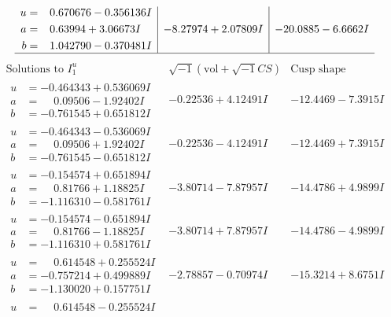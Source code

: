 \documentclass[1p]{elsarticle_modified}
\theoremstyle{definition}
\newcommand{\I}{\sqrt{-1}}
\begin{document}
$$\begin{array}{c|c|c}
\begin{aligned}
u &= \phantom{-}0.670676 - 0.356136 I \\
a &= \phantom{-}0.63994 + 3.06673 I \\
b &= \phantom{-}1.042790 - 0.370481 I\end{aligned}
 & -8.27974 + 2.07809 I & -20.0885 - 6.6662 I\\
 \hline 
 \end{array}$$\newpage$$\begin{array}{c|c|c}  
\text{Solutions to }I^u_{1}& \I (\text{vol} + \sqrt{-1}CS) & \text{Cusp shape}\\
 \hline 
\begin{aligned}
u &= -0.464343 + 0.536069 I \\
a &= \phantom{-}0.09506 - 1.92402 I \\
b &= -0.761545 + 0.651812 I\end{aligned}
 & -0.22536 + 4.12491 I & -12.4469 - 7.3915 I \\ \hline\begin{aligned}
u &= -0.464343 - 0.536069 I \\
a &= \phantom{-}0.09506 + 1.92402 I \\
b &= -0.761545 - 0.651812 I\end{aligned}
 & -0.22536 - 4.12491 I & -12.4469 + 7.3915 I \\ \hline\begin{aligned}
u &= -0.154574 + 0.651894 I \\
a &= \phantom{-}0.81766 + 1.18825 I \\
b &= -1.116310 - 0.581761 I\end{aligned}
 & -3.80714 - 7.87957 I & -14.4786 + 4.9899 I \\ \hline\begin{aligned}
u &= -0.154574 - 0.651894 I \\
a &= \phantom{-}0.81766 - 1.18825 I \\
b &= -1.116310 + 0.581761 I\end{aligned}
 & -3.80714 + 7.87957 I & -14.4786 - 4.9899 I \\ \hline\begin{aligned}
u &= \phantom{-}0.614548 + 0.255524 I \\
a &= -0.757214 + 0.499889 I \\
b &= -1.130020 + 0.157751 I\end{aligned}
 & -2.78857 - 0.70974 I & -15.3214 + 8.6751 I \\ \hline\begin{aligned}
u &= \phantom{-}0.614548 - 0.255524 I \\

\end{aligned}
\end{array}$$
\end{document}

